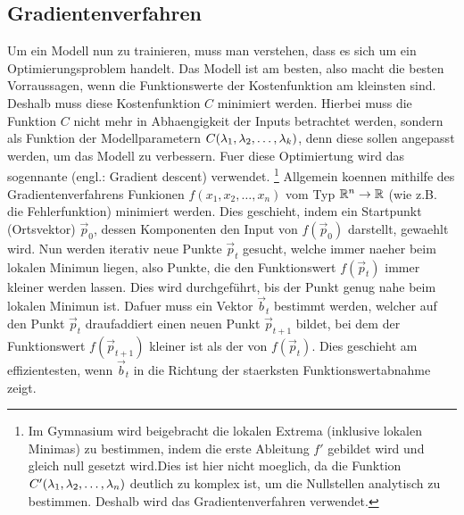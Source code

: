 \subsection{Gradientenverfahren}\label{sec:gradientenverfahren}
Um ein Modell nun zu trainieren, muss man verstehen, dass es sich um ein Optimierungsproblem handelt.
Das Modell ist am besten, also macht die besten Vorraussagen, wenn die
Funktionswerte der Kostenfunktion am kleinsten sind.
Deshalb muss diese Kostenfunktion $C$ minimiert werden.
Hierbei muss die Funktion $C$ nicht mehr in Abhaengigkeit der Inputs betrachtet
werden, sondern als Funktion der Modellparametern
$C(\lambda_1, \lambda_2, \ldots, \lambda_k)$, denn diese sollen angepasst werden,
um das Modell zu verbessern.
Fuer diese Optimiertung wird das sogennante  (engl.: Gradient descent) verwendet.
\footnote{%
  Im Gymnasium wird beigebracht die lokalen Extrema (inklusive lokalen Minimas) zu
  bestimmen, indem die erste Ableitung $f'$ gebildet wird und gleich null gesetzt
  wird.Dies ist hier nicht moeglich, da die Funktion
  $C'(\lambda_1,\lambda_2,\ldots,\lambda_n)$ deutlich zu komplex ist, um die
  Nullstellen analytisch zu bestimmen. Deshalb wird das Gradientenverfahren
  verwendet.
}
\para{}
Allgemein koennen mithilfe des Gradientenverfahrens Funkionen $f(x_1, x_2, \ldots, x_n)$ vom Typ $\mathbb{R}^n \to \mathbb{R}$ (wie z.B. die Fehlerfunktion) minimiert werden.
Dies geschieht, indem ein Startpunkt (Ortsvektor) $\vec{p}_0$, dessen
Komponenten den Input von $f(\vec{p}_0)$ darstellt, gewaehlt wird.
Nun werden iterativ neue Punkte $\vec{p}_t$ gesucht, welche immer naeher beim lokalen Minimun liegen, also Punkte, die den Funktionswert $f(\vec{p}_t)$ immer kleiner werden lassen.
Dies wird durchgeführt, bis der Punkt genug nahe beim lokalen Minimun ist.
\para{}
Dafuer muss ein Vektor $\vec{b}_t$ bestimmt werden, welcher auf den Punkt $\vec{p}_t$ draufaddiert einen neuen Punkt $\vec{p}_{t+1}$ bildet,
bei dem der Funktionswert $f(\vec{p}_{t+1})$ kleiner ist als der von $f(\vec{p}_t)$.
Dies geschieht am effizientesten, wenn $\vec{b}_t$ in die Richtung der staerksten Funktionswertabnahme zeigt.

